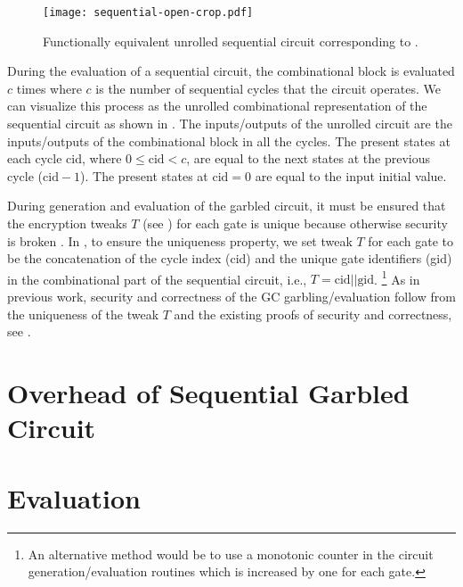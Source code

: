 \begin{figure}[t]
    \centering
	\texttt{[image: sequential-open-crop.pdf]}
	\caption{Functionally equivalent unrolled sequential circuit corresponding to .}
	\label{fig:open-sequential}
\end{figure}

During the evaluation of a sequential circuit, the combinational block is evaluated $c$ times where $c$ is the number of sequential cycles that the circuit operates.
We can visualize this process as the unrolled combinational representation of the sequential circuit as shown in .
The inputs/outputs of the unrolled circuit are the inputs/outputs of the combinational block in all the cycles.
The present states at each cycle $\textrm{cid}$, where $0 \le \textrm{cid} < c$, are equal to the next states at the previous cycle ($\textrm{cid}-1$).
The present states at $\textrm{cid}=0$ are equal to the input initial value.

During generation and evaluation of the garbled circuit, it must be ensured that the encryption tweaks $T$ (see ) for each gate is unique because otherwise security is broken \cite[Sect. 3.4]{henecka2013faster}.
In \sys{}, to ensure the uniqueness property, we set tweak $T$ for each gate to be the concatenation of the cycle index (cid) and the unique gate identifiers (gid) in the combinational part of the sequential circuit, i.e., $T = \textrm{cid} || \textrm{gid}$.
\footnote{An alternative method would be to use a monotonic counter in the circuit generation/evaluation routines which is increased by one for each gate.}
As in previous work, security and correctness of the GC garbling/evaluation follow from the uniqueness of the tweak $T$ and the existing proofs of security and correctness, see \cite{lindell2009proof,bellare2013efficient}.

\section{Overhead of Sequential Garbled Circuit}
\section{Evaluation}

